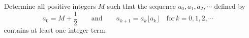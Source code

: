 Determine all positive integers 
$M$
 such that the sequence 
$a_0, a_1, a_2, \cdots$
 defined by 
\[ a_0 = M + \frac{1}{2}   \qquad  \textrm{and} \qquad    a_{k+1} = a_k\lfloor a_k \rfloor   \quad \textrm{for} \, k = 0, 1, 2, \cdots \]
contains at least one integer term.
